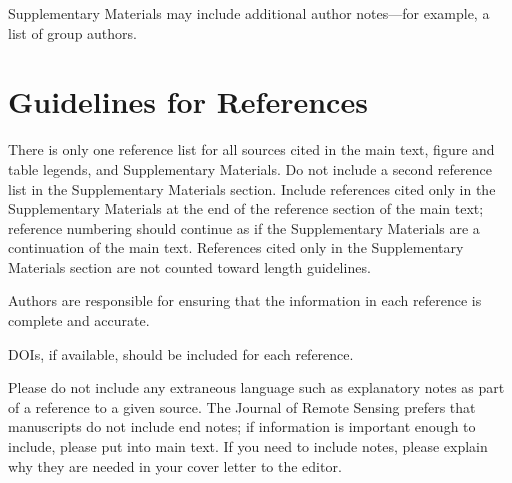 \documentclass{article}
\begin{document}
Supplementary Materials may include additional author notes—for example, a list of group authors.

\section*{Guidelines for References}

There is only one reference list for all sources cited in the main text, figure and table legends, and Supplementary Materials. Do not include a second reference list in the Supplementary Materials section. Include references cited only in the Supplementary Materials at the end of the reference section of the main text; reference numbering should continue as if the Supplementary Materials are a continuation of the main text. References cited only in the Supplementary Materials section are not counted toward length guidelines.

Authors are responsible for ensuring that the information in each reference is complete and accurate.

DOIs, if available, should be included for each reference.

Please do not include any extraneous language such as explanatory notes as part of a reference to a given source. The Journal of Remote Sensing prefers that manuscripts do not include end notes; if information is important enough to include, please put into main text.  If you need to include notes, please explain why they are needed in your cover letter to the editor.

\printbibliography
\end{document}
